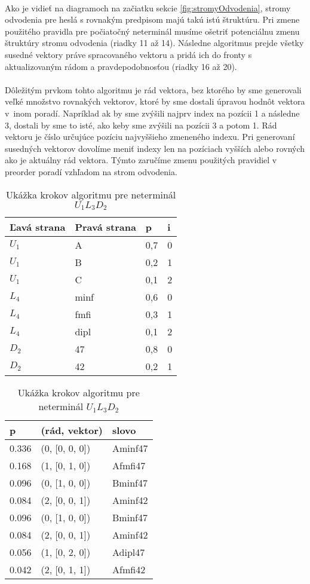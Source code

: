\paragraph{}
Ako je vidieť na diagramoch na začiatku sekcie \ref{fig:stromyOdvodenia}, stromy odvodenia pre heslá s rovnakým predpisom majú takú istú štruktúru. Pri zmene použitého pravidla pre počiatočný neterminál musíme ošetriť potenciálnu zmenu štruktúry stromu odvodenia (riadky 11 až 14). Následne algoritmus prejde všetky susedné vektory práve spracovaného vektoru a pridá ich do fronty s aktualizovaným rádom a pravdepodobnosťou (riadky 16 až 20).

\paragraph{}
Dôležitým prvkom tohto algoritmu je rád vektora, bez ktorého by sme generovali veľké množstvo rovnakých vektorov, ktoré by sme dostali úpravou hodnôt vektora v~inom poradí. Napríklad ak by sme zvýšili najprv index na pozícii 1 a následne 3, dostali by sme to isté, ako keby sme zvýšili na pozícii 3 a potom 1. Rád vektoru je číslo určujúce pozíciu najvyššieho zmeneného indexu. Pri generovaní susedných vektorov dovolíme meniť indexy len na pozíciach vyšších alebo rovných ako je aktuálny rád vektora. Týmto zaručíme zmenu použitých pravidiel v preorder poradí vzhľadom na strom odvodenia.

\begin{table}[]
\centering
\caption{Ukážka krokov algoritmu pre neterminál \(U_1L_3D_2\)}
\label{postupAlgoritmu}
\begin{tabular}{l|lll}
Ľavá strana & Pravá strana & p & i \\ \hline
\(U_1\) & A & 0,7 & 0 \\
\(U_1\) & B & 0,2 & 1 \\
\(U_1\) & C & 0,1 & 2 \\
\(L_4\) & minf & 0,6 & 0 \\
\(L_4\) & fmfi & 0,3 & 1 \\
\(L_4\) & dipl & 0,1 & 2 \\
\(D_2\) & 47 & 0,8 & 0 \\
\(D_2\) & 42 & 0,2 & 1 \\
\end{tabular}
\quad
\begin{tabular}{lll}
p & (rád, vektor) & slovo \\ \hline
0.336 & (0, [0, 0, 0]) & Aminf47 \\ \hline \hline
0.168 & (1, [0, 1, 0]) & Afmfi47 \\
0.096 & (0, [1, 0, 0]) & Bminf47 \\
0.084 & (2, [0, 0, 1]) & Aminf42 \\ \hline \hline
0.096 & (0, [1, 0, 0]) & Bminf47 \\
0.084 & (2, [0, 0, 1]) & Aminf42 \\
0.056 & (1, [0, 2, 0]) & Adipl47 \\
0.042 & (2, [0, 1, 1]) & Afmfi42
\end{tabular}
\end{table}

